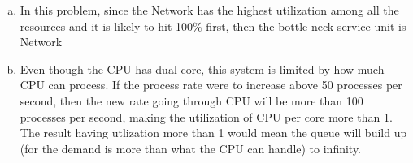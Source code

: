 \documentclass{article}   	                         %
\begin{document}
\begin{enumerate}[(a)]
\item
In this problem, since the Network has the highest utilization among all the resources and it is likely to hit 100\% first, then the bottle-neck service unit is Network 
\item
Even though the CPU has dual-core, this system is limited by how much CPU can process. If the process rate were to increase above 50 processes per second, then the new rate going through CPU will be more than 100 processes per second, making the utilization of CPU per core more than 1. The result having utlization more than 1 would mean the queue will build up (for the demand is more than what the CPU can handle) to infinity. 
\end{enumerate}
\end{document}
